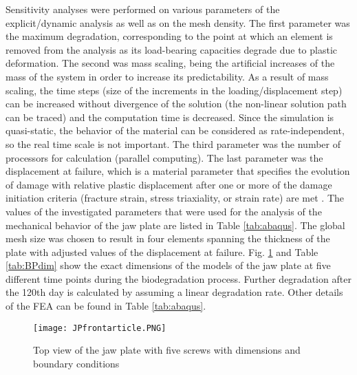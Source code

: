 Sensitivity analyses were performed on various parameters of the explicit/dynamic analysis as well as on the mesh density. The first parameter was the maximum degradation, corresponding to the point at which an element is removed from the analysis as its load-bearing capacities degrade due to plastic deformation. The second was mass scaling, being the artificial increases of the mass of the system in order to increase its predictability. As a result of mass scaling, the time steps (size of the increments in the loading/displacement step) can be increased without divergence of the solution (the non-linear solution path can be traced) and the computation time is decreased. Since the simulation is quasi-static, the behavior of the material can be considered as rate-independent, so the real time scale is not important. The third parameter was the number of processors for calculation (parallel computing). The last parameter was the displacement at failure, which is a material parameter that specifies the evolution of damage with relative plastic displacement after one or more of the damage initiation criteria (fracture strain, stress triaxiality, or strain rate) are met \cite{daf,daf2}. The values of the investigated parameters that were used for the analysis of the mechanical behavior of the jaw plate are listed in Table \ref{tab:abaqus}. The global mesh size was chosen to result in four elements spanning the thickness of the plate with adjusted values of the displacement at failure. Fig. \ref{fig:BPfrontdim} and Table \ref{tab:BPdim} show the exact dimensions of the models of the jaw plate at five different time points during the biodegradation process. Further degradation after the 120th day is calculated by assuming a linear degradation rate. Other details of the FEA can be found in Table \ref{tab:abaqus}.

\begin{figure}[h]
    \centering
    \texttt{[image: JPfrontarticle.PNG]}
    \caption{Top view of the jaw plate with five screws with dimensions and boundary conditions}
    \label{fig:BPfrontdim}
\end{figure}

